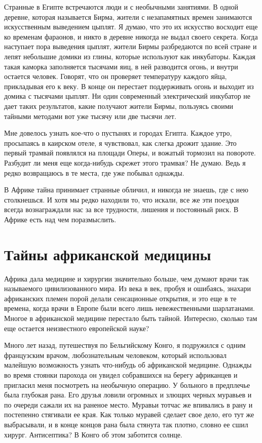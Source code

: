 \documentclass[12pt,a4paper,twoside,openany,svgnames]{memoir}
\begin{document}
Странные в Египте встречаются люди и с необычными занятиями. В одной деревне, которая называется Бирма, жители с незапамятных времен занимаются искусственным выведением цыплят. Я думаю, что это их искусство восходит еще ко временам фараонов, и никто в деревне никогда не выдал своего секрета. Когда наступает пора выведения цыплят, жители Бирмы разбредаются по всей стране и лепят небольшие домики из глины, которые используют как инкубаторы. Каждая такая каморка заполняется тысячами яиц, в ней разводится огонь, и внутри остается человек. Говорят, что он проверяет температуру каждого яйца, прикладывая его к веку. В конце он перестает поддерживать огонь и выходит из домика с тысячами цыплят. Ни один современный электрический инкубатор не дает таких результатов, какие получают жители Бирмы, пользуясь своими тайными методами вот уже тысячу или две тысячи лет.

Мне довелось узнать кое-что о пустынях и городах Египта. Каждое утро, просыпаясь в каирском отеле, я чувствовал, как слегка дрожит здание. Это первый трамвай появлялся на площади Оперы, и вожатый тормозил на повороте. Разбудит ли меня еще когда-нибудь скрежет этого трамвая? Не думаю. Ведь я редко возвращаюсь в те места, где уже побывал однажды.

В Африке тайна принимает странные обличил, и никогда не знаешь, где с нею столкнешься. И хотя мы редко находили то, что искали, все же эти поездки всегда вознаграждали нас за все трудности, лишения и постоянный риск. В Африке есть над чем поразмыслить.

\chapter{Тайны африканской медицины}

Африка дала медицине и хирургии значительно больше, чем думают врачи так называемого цивилизованного мира. Из века в век, пробуя и ошибаясь, знахари африканских племен порой делали сенсационные открытия, и это еще в те времена, когда врачи в Европе были всего лишь невежественными шарлатанами. Многое в африканской медицине перестало быть тайной. Интересно, сколько там еще остается неизвестного европейской науке?

Много лет назад, путешествуя по Бельгийскому Конго, я подружился с одним французским врачом, любознательным человеком, который использовал малейшую возможность узнать что-нибудь об африканской медицине. Однажды во время стоянки парохода он увидел собравшихся на берегу африканцев и пригласил меня посмотреть на необычную операцию. У больного в предплечье была глубокая рана. Его друзья ловили огромных и злющих черных муравьев и по очереди сажали их на раненое место. Муравьи тотчас же впивались в рану и постепенно стягивали ее края. Как только муравей сделает свое дело, его тут же выбрасывали, и в конце концов рана была стянута так плотно, словно ее сшил хирург. Антисептика? В Конго об этом заботится солнце.
\end{document}

